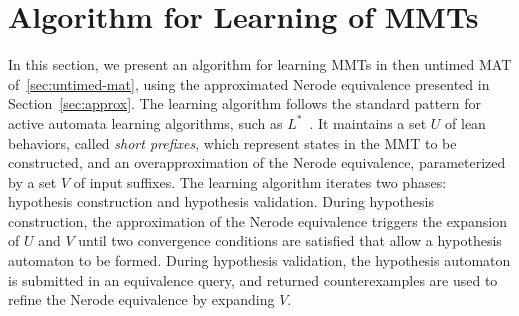 \section{Algorithm for Learning of MMTs}
\label{sec:learning}


In this section, we present an algorithm for learning MMTs in then untimed
MAT of~\ref{sec:untimed-mat}, using the approximated Nerode equivalence
presented in Section~\ref{sec:approx}.
The learning algorithm follows the standard pattern for active automata learning
algorithms, such as $L^*$~\cite{Ang87}. It maintains
a set $U$ of lean behaviors, called {\em short prefixes}, which
represent states in the MMT to be constructed,
and an overapproximation of the Nerode equivalence,
parameterized by a set $V$ of input suffixes.
The learning algorithm iterates two phases: hypothesis construction and
hypothesis validation.
During hypothesis construction,
the approximation of the Nerode equivalence triggers the expansion of
$U$ and $V$ until two convergence conditions are satisfied that allow
a hypothesis automaton to be formed.
During hypothesis validation, the hypothesis automaton is submitted in an
equivalence query, and returned counterexamples are used to refine
the Nerode equivalence by expanding $V$.


